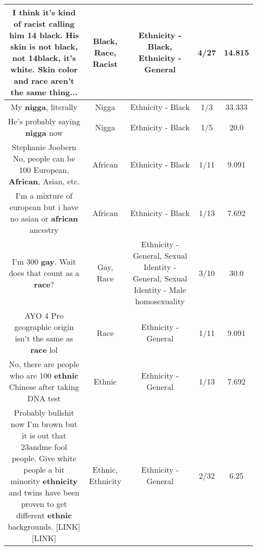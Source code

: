 \documentclass[11pt]{article}
\newlength\mylength
\begin{document}
\begin{center}
\begin{longtable}{|C{.65\mylength}|C{.30\mylength}|C{.12\mylength}|C{.12\mylength}|C{.12\mylength}|}
  \small I think it's kind of \textbf{racist} calling him 14 \textbf{black}. His skin is not \textbf{black}, not 14\textbf{black},  it's white. Skin color and \textbf{race} aren't the same thing...\normalsize   & Black, Race, Racist & Ethnicity - Black, Ethnicity - General & 4/27 & 14.815 \\  \hline
  \small My \textbf{nigga}, literally\normalsize   & Nigga & Ethnicity - Black & 1/3 & 33.333 \\  \hline
  \small He's probably saying \textbf{nigga} now\normalsize   & Nigga & Ethnicity - Black & 1/5 & 20.0 \\  \hline
  \small Stephanie Joobern No, people can be 100 European, \textbf{African}, Asian, etc.\normalsize   & African & Ethnicity - Black & 1/11 & 9.091 \\  \hline
  \small I'm a mixture of european but i have no asian or \textbf{african} ancestry\normalsize   & African & Ethnicity - Black & 1/13 & 7.692 \\  \hline
  \small I'm 300 \textbf{g\textbf{ay}}. Wait does that count as a \textbf{race}?\normalsize   & Gay, Race & Ethnicity - General, Sexual Identity - General, Sexual Identity - Male homosexuality & 3/10 & 30.0 \\  \hline
  \small AYO 4 Pro geographic origin isn't the same as \textbf{race} lol\normalsize   & Race & Ethnicity - General & 1/11 & 9.091 \\  \hline
  \small No, there are people who are 100 \textbf{ethnic} Chinese after taking DNA test\normalsize   & Ethnic & Ethnicity - General & 1/13 & 7.692 \\  \hline
  \small Probably bullshit now I'm brown but it is out that 23andme fool people. Give white people a bit minority \textbf{ethnicity} and twins have been proven to get different \textbf{ethnic} backgrounds. [LINK]  [LINK] \normalsize   & Ethnic, Ethnicity & Ethnicity - General & 2/32 & 6.25 \\  \hline

\end{longtable}
\end{center}
\end{document}
